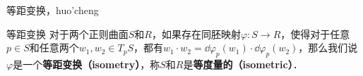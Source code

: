 

等距变换，huo'cheng

\begin{definition}{等距变换}
对于两个正则曲面$S$和$R$，如果存在同胚映射$\varphi:S\to R$，使得对于任意$p\in S$和任意两个$w_1, w_2\in T_pS$，都有$w_1\cdot w_2=\dd\varphi_p(w_1)\cdot\dd\varphi_p(w_2)$，那么我们说$\varphi$是一个\textbf{等距变换（isometry）}，称$S$和$R$是\textbf{等度量的（isometric）}．
\end{definition}






